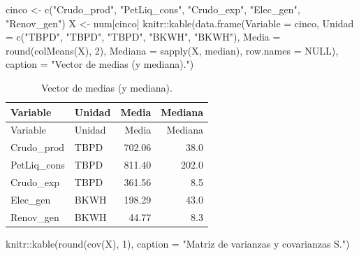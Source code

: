 \documentclass[oneside, openany, fontset=libertinus]{mitthesis}
\newenvironment{Shaded}{\begin{snugshade}}{\end{snugshade}}
\newcommand{\AttributeTok}[1]{\textcolor[rgb]{0.40,0.45,0.13}{#1}}
\newcommand{\ConstantTok}[1]{\textcolor[rgb]{0.56,0.35,0.01}{#1}}
\newcommand{\DecValTok}[1]{\textcolor[rgb]{0.68,0.00,0.00}{#1}}
\newcommand{\FunctionTok}[1]{\textcolor[rgb]{0.28,0.35,0.67}{#1}}
\newcommand{\NormalTok}[1]{\textcolor[rgb]{0.00,0.23,0.31}{#1}}
\newcommand{\OtherTok}[1]{\textcolor[rgb]{0.00,0.23,0.31}{#1}}
\newcommand{\SpecialCharTok}[1]{\textcolor[rgb]{0.37,0.37,0.37}{#1}}
\newcommand{\StringTok}[1]{\textcolor[rgb]{0.13,0.47,0.30}{#1}}
\begin{document}
\begin{Shaded}
\begin{Highlighting}[]
\NormalTok{cinco }\OtherTok{\textless{}{-}} \FunctionTok{c}\NormalTok{(}\StringTok{"Crudo\_prod"}\NormalTok{, }\StringTok{"PetLiq\_cons"}\NormalTok{, }\StringTok{"Crudo\_exp"}\NormalTok{, }\StringTok{"Elec\_gen"}\NormalTok{,}
           \StringTok{"Renov\_gen"}\NormalTok{)}
\NormalTok{X }\OtherTok{\textless{}{-}}\NormalTok{ num[cinco]}
\NormalTok{knitr}\SpecialCharTok{::}\FunctionTok{kable}\NormalTok{(}\FunctionTok{data.frame}\NormalTok{(}\AttributeTok{Variable =}\NormalTok{ cinco,}
                        \AttributeTok{Unidad =} \FunctionTok{c}\NormalTok{(}\StringTok{"TBPD"}\NormalTok{, }\StringTok{"TBPD"}\NormalTok{, }\StringTok{"TBPD"}\NormalTok{, }\StringTok{"BKWH"}\NormalTok{,}
                                   \StringTok{"BKWH"}\NormalTok{),}
                        \AttributeTok{Media =} \FunctionTok{round}\NormalTok{(}\FunctionTok{colMeans}\NormalTok{(X), }\DecValTok{2}\NormalTok{),}
                        \AttributeTok{Mediana =} \FunctionTok{sapply}\NormalTok{(X, median),}
                        \AttributeTok{row.names =} \ConstantTok{NULL}\NormalTok{),}
             \AttributeTok{caption =} \StringTok{"Vector de medias (y mediana)."}\NormalTok{)}
\end{Highlighting}
\end{Shaded}

\Needspace{2.12in}

\begin{longtable}[]{@{}llrr@{}}
\caption{Vector de medias (y mediana).}\tabularnewline
\toprule\noalign{}
Variable & Unidad & Media & Mediana \\
\midrule\noalign{}
\endfirsthead
\toprule\noalign{}
Variable & Unidad & Media & Mediana \\
\midrule\noalign{}
\endhead
\bottomrule\noalign{}
\endlastfoot
Crudo\_prod & TBPD & 702.06 & 38.0 \\
PetLiq\_cons & TBPD & 811.40 & 202.0 \\
Crudo\_exp & TBPD & 361.56 & 8.5 \\
Elec\_gen & BKWH & 198.29 & 43.0 \\
Renov\_gen & BKWH & 44.77 & 8.3 \\
\end{longtable}

\Needspace{2.47in}

\begin{Shaded}
\begin{Highlighting}[]
\NormalTok{knitr}\SpecialCharTok{::}\FunctionTok{kable}\NormalTok{(}\FunctionTok{round}\NormalTok{(}\FunctionTok{cov}\NormalTok{(X), }\DecValTok{1}\NormalTok{),}
             \AttributeTok{caption =} \StringTok{"Matriz de varianzas y covarianzas S."}\NormalTok{)}
\end{Highlighting}
\end{Shaded}
\end{document}
